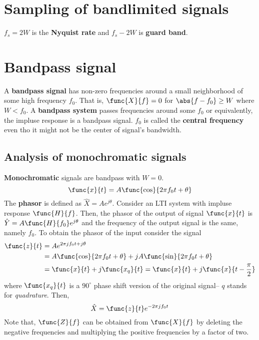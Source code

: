 \section{Sampling of bandlimited signals}
\(f_s = 2W\) is the \textbf{Nyquist rate} and \(f_s -  2W\) is \textbf{guard band}.
\section{Bandpass signal}
A \textbf{bandpass signal} has non-zero frequencies around a small neighborhood of some high frequency \(f_0\). That is, \(\func{X}{f} = 0\) for \(\abs{f - f_0} \geq W\) where \(W < f_0\). A \textbf{bandpass system} passes frequencies around some \(f_0\) or equivalently, the impluse response is a bandpass signal. \(f_0\) is called the \textbf{central frequency} even tho it might not be the center of signal's bandwidth. 
\subsection{Analysis of monochromatic signals}
\textbf{Monochromatic} signals are bandpass with \(W = 0\). 
\begin{equation*}
    \func{x}{t} = A \func{\cos}{2\pi f_0 t + \theta}
\end{equation*}
The \textbf{phasor} is defined as \(\hat{X} = A e^{j\theta}\). Consider an LTI system with impluse response \(\func{H}{f}\). Then, the phasor of the output of signal \(\func{x}{t}\) is \(\hat{Y} = A \func{H}{f_0} e^{j\theta}\) and the frequency of the output signal is the same, namely \(f_0\). To obtain the phasor of the input consider the signal 
\begin{align*}
    \func{z}{t} &= A e^{2\pi j f_0 t + j\theta }\\
    &= A \func{\cos}{2\pi f_0 t + \theta} + jA \func{\sin}{2\pi f_0 t + \theta} \\
    &= \func{x}{t} + j \func{x_q}{t} = \func{x}{t} + j \func{x}{t - \frac{\pi}{2}}
\end{align*}
where \(\func{x_q}{t}\) is a \(90^{\circ}\) phase shift version of the original signal-- \(q\) stands for \textit{quadrature}. Then, 
\begin{equation*}
    \hat{X} = \func{z}{t} e^{-2\pi j f_0 t}
\end{equation*}
Note that, \(\func{Z}{f}\) can be obtained from \(\func{X}{f}\) by deleting the negative frequencies and multiplying the positive frequencies by a factor of two. 


